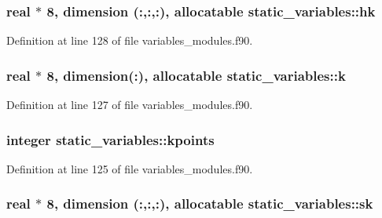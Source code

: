 \subsubsection[{\texorpdfstring{hk}{hk}}]{\setlength{\rightskip}{0pt plus 5cm}real $\ast$ 8, dimension (\+:,\+:,\+:), allocatable static\+\_\+variables\+::hk}\hypertarget{namespacestatic__variables_a2a3637153de124a5886a991d54b44f25}{}\label{namespacestatic__variables_a2a3637153de124a5886a991d54b44f25}


Definition at line 128 of file variables\+\_\+modules.\+f90.

\subsubsection[{\texorpdfstring{k}{k}}]{\setlength{\rightskip}{0pt plus 5cm}real $\ast$ 8, dimension(\+:), allocatable static\+\_\+variables\+::k}\hypertarget{namespacestatic__variables_af88be19e58d424bcd134981f4ecd4e16}{}\label{namespacestatic__variables_af88be19e58d424bcd134981f4ecd4e16}


Definition at line 127 of file variables\+\_\+modules.\+f90.

\subsubsection[{\texorpdfstring{kpoints}{kpoints}}]{\setlength{\rightskip}{0pt plus 5cm}integer static\+\_\+variables\+::kpoints}\hypertarget{namespacestatic__variables_a5d1033bb9fdfdb069bcd5daa750990a6}{}\label{namespacestatic__variables_a5d1033bb9fdfdb069bcd5daa750990a6}


Definition at line 125 of file variables\+\_\+modules.\+f90.

\subsubsection[{\texorpdfstring{sk}{sk}}]{\setlength{\rightskip}{0pt plus 5cm}real $\ast$ 8, dimension (\+:,\+:,\+:), allocatable static\+\_\+variables\+::sk}\hypertarget{namespacestatic__variables_acf88451b31cf225c9d75dfa81b578d13}{}\label{namespacestatic__variables_acf88451b31cf225c9d75dfa81b578d13}


